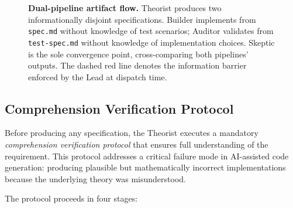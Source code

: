\begin{figure}[!t]
\caption{%
  \textbf{Dual-pipeline artifact flow.}
  Theorist produces two informationally disjoint specifications.
  Builder implements from \texttt{spec.md} without knowledge of test
  scenarios; Auditor validates from \texttt{test-spec.md} without
  knowledge of implementation choices. Skeptic is the sole
  convergence point, cross-comparing both pipelines' outputs.
  The dashed red line denotes the information barrier enforced by
  the Lead at dispatch time.
}
\label{fig:pipeline-detail}
\end{figure}


\subsection{Comprehension Verification Protocol}
\label{sec:comprehension}

Before producing any specification, the Theorist executes a mandatory
\emph{comprehension verification protocol} that ensures full
understanding of the requirement. This protocol addresses a critical
failure mode in AI-assisted code generation: producing plausible but
mathematically incorrect implementations because the underlying
theory was misunderstood.

The protocol proceeds in four stages:

